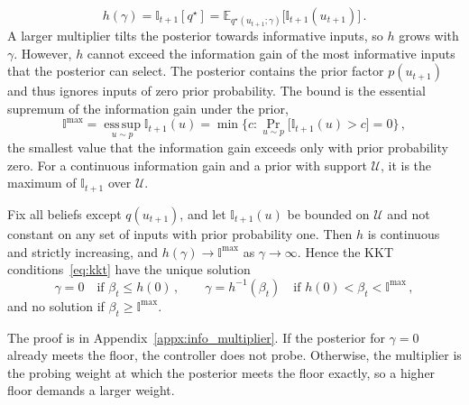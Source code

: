 \documentclass{l4dc2027}
\def\cU{\mathcal{U}}
\newcommand{\E}{\mathbb{E}}
\begin{document}
\begin{equation}\label{eq:expected-info}
	h(\gamma) = \mathbb{I}_{t+1}[q^\star] = \E_{q^\star(u_{t+1};\gamma)}\big[\mathbb{I}_{t+1}(u_{t+1})\big] \, .
\end{equation}
A larger multiplier tilts the posterior towards informative inputs, so $h$ grows with $\gamma$. However, $h$ cannot exceed the information gain of the most informative inputs that the posterior can select. The posterior contains the prior factor $p(u_{t+1})$ and thus ignores inputs of zero prior probability. The bound is the essential supremum of the information gain under the prior,
\begin{equation}\label{eq:ess-sup}
	\mathbb{I}^{\max} = \operatorname*{ess\,sup}_{u \sim p} \mathbb{I}_{t+1}(u) = \min\Big\{ c : \Pr_{u \sim p}\big[\mathbb{I}_{t+1}(u) > c\big] = 0 \Big\} \, ,
\end{equation}
the smallest value that the information gain exceeds only with prior probability zero. For a continuous information gain and a prior with support $\cU$, it is the maximum of $\mathbb{I}_{t+1}$ over $\cU$.

\begin{lemma}\label{lem:multiplier}
Fix all beliefs except $q(u_{t+1})$, and let $\mathbb{I}_{t+1}(u)$ be bounded on $\cU$ and not constant on any set of inputs with prior probability one. Then $h$ is continuous and strictly increasing, and $h(\gamma) \to \mathbb{I}^{\max}$ as $\gamma \to \infty$. Hence the KKT conditions~\eqref{eq:kkt} have the unique solution
\begin{equation}\label{eq:multiplier-cases}
	\gamma = 0 \quad \text{if } \beta_t \leq h(0) \, , \qquad \gamma = h^{-1}(\beta_t) \quad \text{if } h(0) < \beta_t < \mathbb{I}^{\max} \, ,
\end{equation}
and no solution if $\beta_t \geq \mathbb{I}^{\max}$.
\end{lemma}
The proof is in Appendix~\ref{appx:info_multiplier}. If the posterior for $\gamma = 0$ already meets the floor, the controller does not probe. Otherwise, the multiplier is the probing weight at which the posterior meets the floor exactly, so a higher floor demands a larger weight.
%

\end{document}

